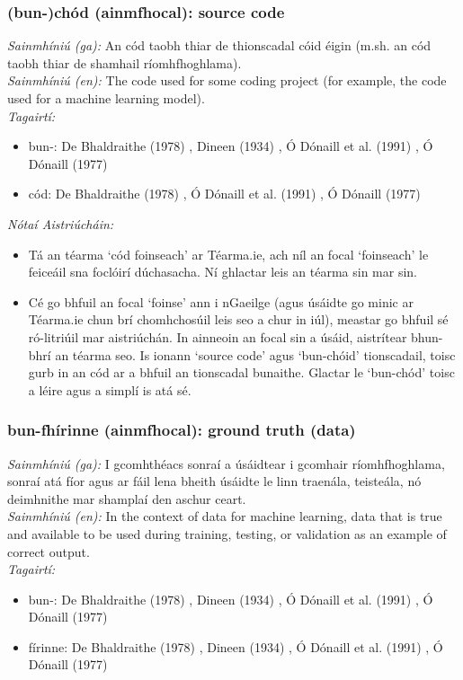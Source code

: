 \documentclass{article}
\begin{document}
\subsubsection*{(bun-)chód (ainmfhocal): source code}
 \noindent \textit{Sainmhíniú (ga):} An cód taobh thiar de thionscadal cóid éigin (m.sh. an cód taobh thiar de shamhail ríomhfhoghlama).
\\
 \noindent \textit{Sainmhíniú (en):} The code used for some coding project (for example, the code used for a machine learning model).
\\
 \noindent \textit{Tagairtí:}
\begin{itemize}
	\item bun-: De Bhaldraithe (1978) \cite{de-bhaldraithe}, Dineen (1934) \cite{dineen}, Ó Dónaill et al. (1991) \cite{focloir-beag}, Ó Dónaill (1977) \cite{odonaill}
	\item cód: De Bhaldraithe (1978) \cite{de-bhaldraithe}, Ó Dónaill et al. (1991) \cite{focloir-beag}, Ó Dónaill (1977) \cite{odonaill}
\end{itemize}

 \noindent \textit{Nótaí Aistriúcháin:}
\begin{itemize}
	\item Tá an téarma `cód foinseach' ar Téarma.ie, ach níl an focal `foinseach' le feiceáil sna foclóirí dúchasacha. Ní ghlactar leis an téarma sin mar sin.
	\item Cé go bhfuil an focal `foinse' ann i nGaeilge (agus úsáidte go minic ar Téarma.ie chun brí chomhchosúil leis seo a chur in iúl), meastar go bhfuil sé ró-litriúil mar aistriúchán. In ainneoin an focal sin a úsáid, aistrítear bhun-bhrí an téarma seo. Is ionann `source code' agus `bun-chóid' tionscadail, toisc gurb in an cód ar a bhfuil an tionscadal bunaithe. Glactar le `bun-chód' toisc a léire agus a simplí is atá sé.
\end{itemize}


\subsubsection*{bun-fhírinne (ainmfhocal): ground truth (data)}
 \noindent \textit{Sainmhíniú (ga):} I gcomhthéacs sonraí a úsáidtear i gcomhair ríomhfhoghlama, sonraí atá fíor agus ar fáil lena bheith úsáidte le linn traenála, teisteála, nó deimhnithe mar shamplaí den aschur ceart.
\\
 \noindent \textit{Sainmhíniú (en):} In the context of data for machine learning, data that is true and available to be used during training, testing, or validation as an example of correct output.
\\
 \noindent \textit{Tagairtí:}
\begin{itemize}
	\item bun-: De Bhaldraithe (1978) \cite{de-bhaldraithe}, Dineen (1934) \cite{dineen}, Ó Dónaill et al. (1991) \cite{focloir-beag}, Ó Dónaill (1977) \cite{odonaill}
	\item fírinne: De Bhaldraithe (1978) \cite{de-bhaldraithe}, Dineen (1934) \cite{dineen}, Ó Dónaill et al. (1991) \cite{focloir-beag}, Ó Dónaill (1977) \cite{odonaill}
\end{itemize}
\end{document}
